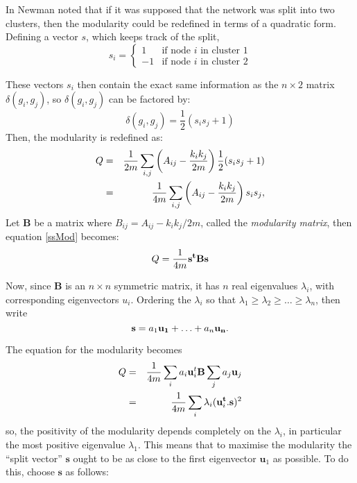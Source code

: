 In \cite{Newman2006a} Newman noted that if it was supposed that the network was 
split into two clusters, then the modularity could be redefined in terms of a
quadratic form.  Defining a vector $s$, which keeps track of the
split,
\begin{equation}
s_i = \left\{ \begin{array}{ll} 1 & \mbox{if node $i$ in cluster 1}
  \\ -1 & \mbox{if node $i$ in cluster 2}\end{array} \right.
\end{equation}

These vectors $s_i$ then contain the exact same information as the $n\times 2$ matrix $\delta (g_i,g_j)$, so $\delta (g_i,g_j) $ can be factored by:
\begin{equation}
\delta (g_i,g_j) = \frac{1}{2} \left( s_i s_j + 1 \right)
\end{equation}
Then, the modularity is redefined as:
\begin{eqnarray} \label{ssMod}
Q & = & \frac{1}{2m}\sum_{i,j} \left(A_{ij} - \frac{k_ik_j}{2m}\right)\frac{1}{2}(s_is_j + 1)\cr
& = &\frac{1}{4m}\sum_{i,j} \left(A_{ij} - \frac{k_ik_j}{2m}\right)s_is_j,
\end{eqnarray}
Let $\mathbf{B}$ be a matrix where 
$B_{ij} = A_{ij} - k_ik_j/2m$, called the \emph{modularity matrix}, 
then equation \ref{ssMod} becomes:
\begin{equation}
Q = \frac{1}{4m}{\bf s^tBs}
\end{equation}

Now, since $\mathbf{B}$ is an $n\times n$ symmetric matrix, it has $n$ real eigenvalues $\lambda_i$, with corresponding
eigenvectors $u_i$.  Ordering the $\lambda_i$ so that $
\lambda_1 \geq \lambda_2 \geq \ldots \geq \lambda_n$, then write 
\begin{equation}
{\bf s} = a_1{\bf u_1}+ \ldots + a_n{\bf u_n}.
\end{equation}


The equation for the modularity becomes
\begin{eqnarray}
Q & = & \frac{1}{4m} \sum_{i} a_i{\bf u}_i^t{\bf B}\sum_ja_j{\bf u}_j\cr
& = & \frac{1}{4m} \sum_i \lambda_i ({\bf u}_i^{\bf t}.{\bf s})^2
\end{eqnarray}
so, the positivity of the modularity depends completely on the $\lambda_i$, in 
particular the most positive eigenvalue $\lambda_1$.  This means that to 
maximise the modularity the ``split vector'' $\mathbf{s}$ ought to be 
as close to the first eigenvector $\mathbf{u}_1$ as possible. To do this, 
choose $\mathbf{s}$ as follows:

